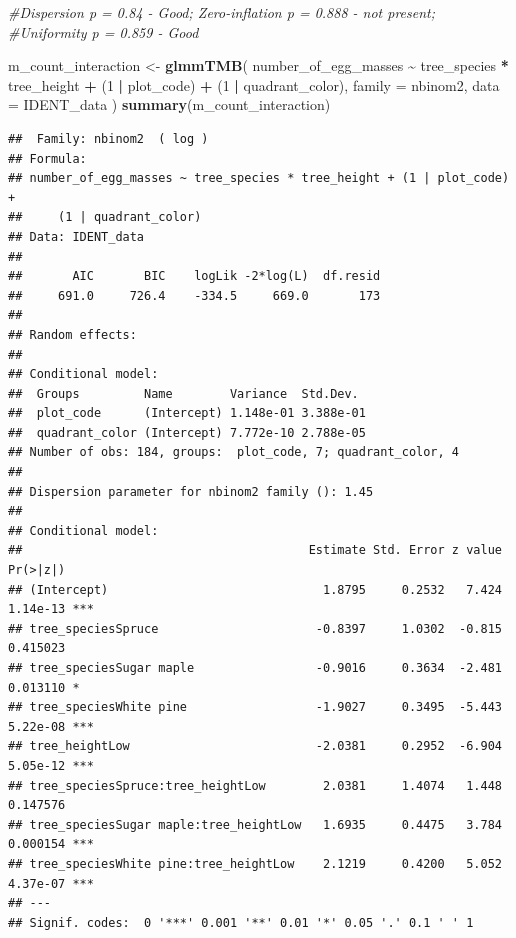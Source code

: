 \documentclass[
]{article}
\newenvironment{Shaded}{\begin{snugshade}}{\end{snugshade}}
\newcommand{\AttributeTok}[1]{\textcolor[rgb]{0.13,0.29,0.53}{#1}}
\newcommand{\CommentTok}[1]{\textcolor[rgb]{0.56,0.35,0.01}{\textit{#1}}}
\newcommand{\DecValTok}[1]{\textcolor[rgb]{0.00,0.00,0.81}{#1}}
\newcommand{\FunctionTok}[1]{\textcolor[rgb]{0.13,0.29,0.53}{\textbf{#1}}}
\newcommand{\NormalTok}[1]{#1}
\newcommand{\OtherTok}[1]{\textcolor[rgb]{0.56,0.35,0.01}{#1}}
\newcommand{\SpecialCharTok}[1]{\textcolor[rgb]{0.81,0.36,0.00}{\textbf{#1}}}
\begin{document}
\begin{Shaded}
\begin{Highlighting}[]
\CommentTok{\#Dispersion p = 0.84 {-} Good; Zero{-}inflation p = 0.888 {-} not present;}
\CommentTok{\#Uniformity p = 0.859 {-} Good}

\NormalTok{m\_count\_interaction }\OtherTok{\textless{}{-}} \FunctionTok{glmmTMB}\NormalTok{(}
\NormalTok{  number\_of\_egg\_masses }\SpecialCharTok{\textasciitilde{}}\NormalTok{ tree\_species }\SpecialCharTok{*}\NormalTok{ tree\_height }\SpecialCharTok{+}\NormalTok{ (}\DecValTok{1} \SpecialCharTok{|}\NormalTok{ plot\_code) }\SpecialCharTok{+}
\NormalTok{    (}\DecValTok{1} \SpecialCharTok{|}\NormalTok{ quadrant\_color),}
  \AttributeTok{family =}\NormalTok{ nbinom2,}
  \AttributeTok{data =}\NormalTok{ IDENT\_data}
\NormalTok{)}
\FunctionTok{summary}\NormalTok{(m\_count\_interaction)}
\end{Highlighting}
\end{Shaded}

\begin{verbatim}
##  Family: nbinom2  ( log )
## Formula:          
## number_of_egg_masses ~ tree_species * tree_height + (1 | plot_code) +  
##     (1 | quadrant_color)
## Data: IDENT_data
## 
##       AIC       BIC    logLik -2*log(L)  df.resid 
##     691.0     726.4    -334.5     669.0       173 
## 
## Random effects:
## 
## Conditional model:
##  Groups         Name        Variance  Std.Dev. 
##  plot_code      (Intercept) 1.148e-01 3.388e-01
##  quadrant_color (Intercept) 7.772e-10 2.788e-05
## Number of obs: 184, groups:  plot_code, 7; quadrant_color, 4
## 
## Dispersion parameter for nbinom2 family (): 1.45 
## 
## Conditional model:
##                                        Estimate Std. Error z value Pr(>|z|)    
## (Intercept)                              1.8795     0.2532   7.424 1.14e-13 ***
## tree_speciesSpruce                      -0.8397     1.0302  -0.815 0.415023    
## tree_speciesSugar maple                 -0.9016     0.3634  -2.481 0.013110 *  
## tree_speciesWhite pine                  -1.9027     0.3495  -5.443 5.22e-08 ***
## tree_heightLow                          -2.0381     0.2952  -6.904 5.05e-12 ***
## tree_speciesSpruce:tree_heightLow        2.0381     1.4074   1.448 0.147576    
## tree_speciesSugar maple:tree_heightLow   1.6935     0.4475   3.784 0.000154 ***
## tree_speciesWhite pine:tree_heightLow    2.1219     0.4200   5.052 4.37e-07 ***
## ---
## Signif. codes:  0 '***' 0.001 '**' 0.01 '*' 0.05 '.' 0.1 ' ' 1
\end{verbatim}
\end{document}

